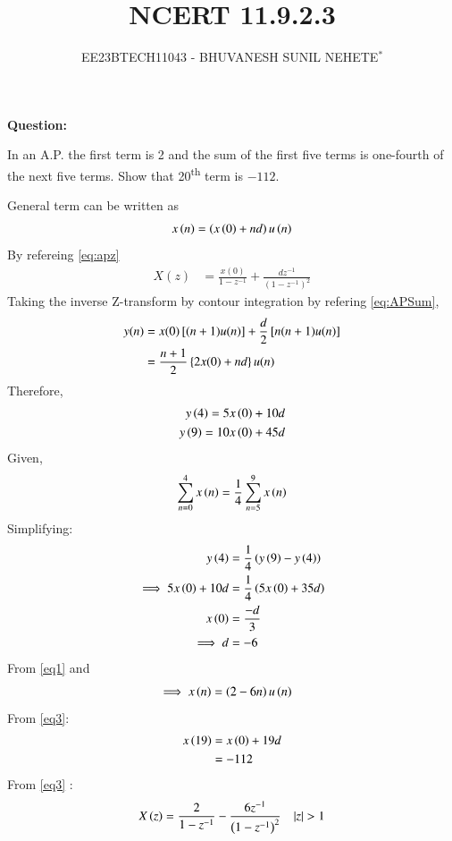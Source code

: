 \documentclass[journal,12pt,twocolumn]{IEEEtran}
\theoremstyle{remark}
\begin{document}

\vspace{3cm}

\title{NCERT 11.9.2.3}
\author{EE23BTECH11043 - BHUVANESH SUNIL NEHETE$^{*}$%
}
\maketitle
\newpage
\bigskip

\renewcommand{\thefigure}{\theenumi}
\renewcommand{\thetable}{\theenumi}



\textbf{Question:}

In an A.P. the first term is 2 and the sum of the first five terms is one-fourth of the next five terms. Show  that 20\textsuperscript{th} term is $-112$.

\solution


General term can be written as
\begin{align}
    x\left(n\right) = \left(x\left(0\right) + nd\right)u\left(n\right)
\end{align}
By refereing \eqref{eq:apz}
\begin{align}
    X(z) &= \frac{x(0)}{1-z^{-1}} + \frac{dz^{-1}}{(1-z^{-1})^{2}}
\end{align}
Taking the inverse Z-transform by contour integration by refering \eqref{eq:APSum},
\begin{align}
    y(n) &= x(0){}\left[(n + 1)u(n)\right] + \frac{d}{2}{}\left[n(n + 1)u(n)\right]\\
    &= \frac{n+1}{2}\left\{2x(0) + nd\right\}u(n)
\end{align}
Therefore, 
\begin{align}
    y\left(4\right)=5x\left(0\right)+10d\\
    y\left(9\right)=10x\left(0\right)+45d
\end{align}
Given, 
   \begin{align}
       \sum_{n=0}^{4}x\left(n\right) = \frac{1}{4}\sum_{n=5}^{9}x\left(n\right)
   \end{align}
Simplifying:
    \begin{align}
        y\left(4\right) &= \frac{1}{4}\left(y\left(9\right)-y\left(4\right)\right)\\
        \implies 5x\left(0\right) + 10d &= \frac{1}{4}\left(5x\left(0\right) + 35d\right)\\
        x\left(0\right) &= \frac{-d}{3}\\
        \implies d &= -6 \label{eq1}
    \end{align}
From \eqref{eq1} and 
    \begin{align}
        \implies x\left(n\right)&=\left(2-6n\right)u\left(n\right) \label{eq3}
   \end{align} 
From \eqref{eq3}:
    \begin{align}
        x\left(19\right)&=x\left(0\right)+19d\\ 
        &= -112
    \end{align}    
From \eqref{eq3} :
    \begin{align}
        X\brak{z}=\frac{2}{1-z^{-1}} - \frac{6z^{-1}}{\brak{1-z^{-1}}^{2}} \quad |z|>1
    \end{align}
\end{document}
